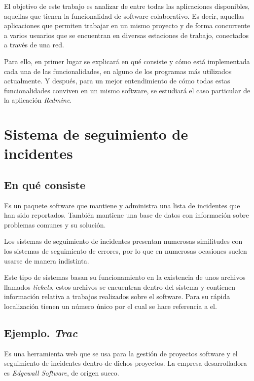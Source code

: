 \documentclass[11pt,a4paper,spanish,twoside]{report}
\begin{document}
El objetivo de este trabajo es analizar de entre todas las aplicaciones
disponibles, aquellas que tienen la funcionalidad de software colaborativo.
Es decir, aquellas aplicaciones que permiten trabajar en un mismo proyecto y
de forma concurrente a varios usuarios que se encuentran en diversas
estaciones de trabajo, conectados a través de una red.

Para ello, en primer lugar se explicará en qué consiste y cómo está
implementada cada una de las funcionalidades, en alguno de los programas más
utilizados actualmente. Y después, para un mejor entendimiento de cómo todas
estas funcionalidades conviven en un mismo software, se estudiará el caso
particular de la aplicación \emph{Redmine}.

\chapter{Sistema de seguimiento de incidentes}
\section{En qué consiste}
Es un paquete software que mantiene y administra una lista de incidentes que
han sido reportados. También mantiene una base de datos con información sobre
problemas comunes y su solución.

Los sistemas de seguimiento de incidentes presentan numerosas similitudes con
los sistemas de seguimiento de errores, por lo que en numerosas ocasiones
suelen usarse de manera indistinta.

Este tipo de sistemas basan su funcionamiento en la existencia de unos
archivos llamados \emph{tickets}, estos archivos se encuentran dentro del
sistema y contienen información relativa a trabajos realizados sobre el
software. Para su rápida localización tienen un número único por el cual se
hace referencia a el.

\section{Ejemplo. \emph{Trac}}
Es una herramienta web que se usa para la gestión de proyectos software y el
seguimiento de incidentes dentro de dichos proyectos. La empresa
desarrolladora es \emph{Edgewall Software}, de origen sueco. \cite{TRA}
\end{document}
